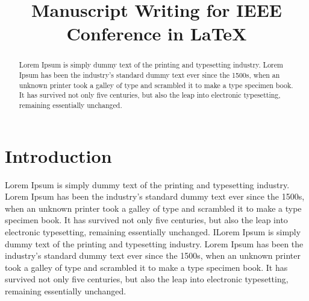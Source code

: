\documentclass[conference]{IEEEtran}
\begin{document}
\title{Manuscript Writing for IEEE Conference in \LaTeX}

\author{%
\and
{}
\and
{}
}

\maketitle

\begin{abstract}
	Lorem Ipsum is simply dummy text of the printing and typesetting industry. Lorem Ipsum has been the industry's standard dummy text ever since the 1500s, when an unknown printer took a galley of type and scrambled it to make a type specimen book. It has survived not only five centuries, but also the leap into electronic typesetting, remaining essentially unchanged.
\end{abstract}

\section{Introduction}
Lorem Ipsum is simply dummy text of the printing and typesetting industry. Lorem Ipsum has been the industry's standard dummy text ever since the 1500s, when an unknown printer took a galley of type and scrambled it to make a type specimen book. It has survived not only five centuries, but also the leap into electronic typesetting, remaining essentially unchanged. ILorem Ipsum is simply dummy text of the printing and typesetting industry. Lorem Ipsum has been the industry's standard dummy text ever since the 1500s, when an unknown printer took a galley of type and scrambled it to make a type specimen book. It has survived not only five centuries, but also the leap into electronic typesetting, remaining essentially unchanged.
\end{document}
